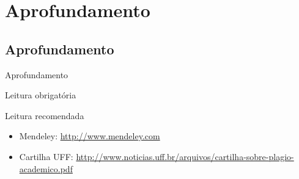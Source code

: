 \documentclass{beamer}
\begin{document}
\section{Aprofundamento}

\subsection{Aprofundamento}

\begin{frame}{Aprofundamento}
  \begin{block}{Leitura obrigatória}
  \end{block}
  \begin{block}{Leitura recomendada}
    \begin{itemize}
      \scriptsize
    \item Mendeley: \url{http://www.mendeley.com}
    \item Cartilha UFF: \url{http://www.noticias.uff.br/arquivos/cartilha-sobre-plagio-academico.pdf}
    \end{itemize}
  \end{block}
\end{frame}
\end{document}
